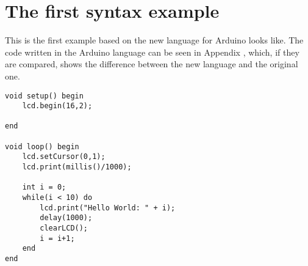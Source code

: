 \section{The first syntax example}
This is the first example based on the new language for Arduino looks like. The code written in the Arduino language can be seen in Appendix , which, if they are compared, shows the difference between the new language and the original one.
\begin{lstlisting}
void setup() begin
    lcd.begin(16,2);
    
end

void loop() begin
    lcd.setCursor(0,1);
    lcd.print(millis()/1000);
    
    int i = 0;
    while(i < 10) do
        lcd.print("Hello World: " + i);
        delay(1000);
        clearLCD();
        i = i+1;
    end
end
\end{lstlisting}